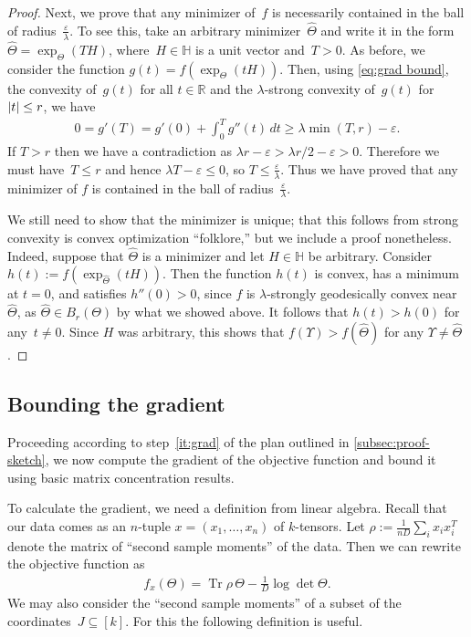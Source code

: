 \documentclass[aos]{imsart}
\theoremstyle{definition}
\numberwithin{equation}{section}
\DeclareMathOperator{\tr}{Tr}
\DeclarePairedDelimiter{\abs}{\lvert}{\rvert}
\newcommand{\R}{{\mathbb{R}}}
\renewcommand{\H}{{\mathbb{H}}}
\newcommand{\htheta}{\widehat{\Theta}}
\newcommand{\eps}{\varepsilon}
\begin{document}
\begin{proof}
Next, we prove that any minimizer of~$f$ is necessarily contained in the ball of radius~$\frac\eps\lambda$.
To see this, take an arbitrary minimizer~$\htheta$ and write it in the form $\htheta = \exp_\Theta(TH)$, where~$H\in \H$ is a unit vector and~$T>0$.
As before, we consider the function $g(t) = f(\exp_\Theta(tH))$.
Then, using \cref{eq:grad bound}, the convexity of~$g(t)$ for all $t\in\R$ and the $\lambda$-strong convexity of~$g(t)$ for~$\abs t \leq  r$, we have
\begin{align*}
  0 = g'(T) = g'(0) + \int_0^T g''(t) \, dt \geq \lambda \min(T,  r) - \eps.
\end{align*}
If $T> r$ then we have a contradiction as $\lambda r - \eps > \lambda r/2 - \eps > 0$.
Therefore we must have~$T\leq r$ and hence $\lambda T - \eps \leq 0$, so $T \leq \frac\eps\lambda$.
Thus we have proved that any minimizer of $f$ is contained in the ball of radius~$\frac\eps\lambda$.

We still need to show that the minimizer is unique; that this follows from strong convexity is convex optimization ``folklore,'' but we include a proof nonetheless.
Indeed, suppose that $\htheta$ is a minimizer and let $H\in \H$ be arbitrary.
Consider $h(t) := f(\exp_{\htheta}(tH))$.
Then the function $h(t)$ is convex, has a minimum at $t=0$, and satisfies $h''(0) > 0$, since $f$ is $\lambda$-strongly geodesically convex near~$\htheta$, as $\htheta \in B_r(\Theta)$ by what we showed above.
It follows that $h(t) > h(0)$ for any~$t\neq0$.
Since $H$ was arbitrary, this shows that $f(\Upsilon) > f(\htheta)$ for any $\Upsilon\neq \htheta$.
\end{proof}

\subsection{Bounding the gradient}
Proceeding according to step~\ref{it:grad} of the plan outlined in \cref{subsec:proof-sketch}, we now compute the gradient of the objective function and bound it using basic matrix concentration results.

To calculate the gradient, we need a definition from linear algebra.
Recall that our data comes as an $n$-tuple $x=(x_1,\dots,x_n)$ of $k$-tensors. %
Let $\rho := \frac1{nD}\sum_i x_i x_i^T$ denote the matrix of ``second sample moments'' of the data.
Then we can rewrite the objective function as
\begin{align}\label{eq:obj via rho}
  f_x(\Theta) = \tr \rho \, \Theta - \frac1D \log \det \Theta.
\end{align}
We may also consider the ``second sample moments'' of a subset of the coordinates~$J \subseteq [k]$.
For this the following definition is useful.
\end{document}
